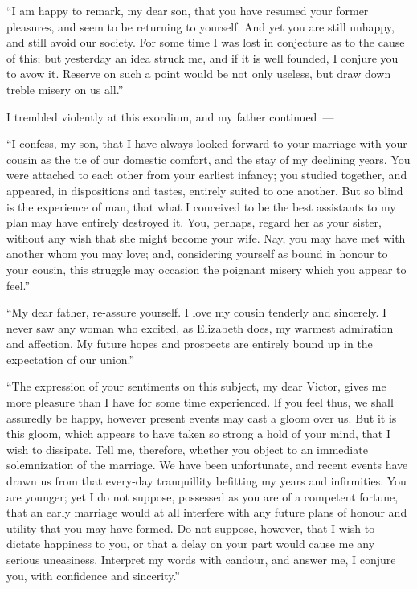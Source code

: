 ``I am happy to remark, my dear
son, that you have resumed your former
pleasures, and seem to be returning to
yourself. And yet you are still unhappy,
and still avoid our society. For
some time I was lost in conjecture as
to the cause of this; but yesterday an
idea struck me, and if it is well founded,
I conjure you to avow it. Reserve
on such a point would be not only
useless, but draw down treble misery
on us all.''

I trembled violently at this exordium,
and my father continued~---

``I confess, my son, that I have always
looked forward to your marriage
with your cousin as the tie of our domestic
comfort, and the stay of my declining
years. You were attached to
each other from your earliest infancy;
you studied together, and appeared, in
dispositions and tastes, entirely suited
to one another. But so blind is the
experience of man, that what I conceived
to be the best assistants to my
plan may have entirely destroyed it.
You, perhaps, regard her as your sister,
without any wish that she might become
your wife. Nay, you may have
met with another whom you may love;
and, considering yourself as bound in
honour to your cousin, this struggle
may occasion the poignant misery which
you appear to feel.''

``My dear father, re-assure yourself.
I love my cousin tenderly and sincerely.
I never saw any woman who excited,
as Elizabeth does, my warmest admiration
and affection. My future hopes
and prospects are entirely bound up in
the expectation of our union.''

``The expression of your sentiments
on this subject, my dear Victor, gives
me more pleasure than I have for some
time experienced. If you feel thus,
we shall assuredly be happy, however
present events may cast a gloom over
us. But it is this gloom, which appears
to have taken so strong a hold of
your mind, that I wish to dissipate.
Tell me, therefore, whether you object
to an immediate solemnization of the
marriage. We have been unfortunate,
and recent events have drawn us from
that every-day tranquillity befitting my
years and infirmities. You are younger;
yet I do not suppose, possessed as you
are of a competent fortune, that an
early marriage would at all interfere
with any future plans of honour and
utility that you may have formed. Do
not suppose, however, that I wish to
dictate happiness to you, or that a delay
on your part would cause me any
serious uneasiness. Interpret my words
with candour, and answer me, I conjure
you, with confidence and sincerity.''


